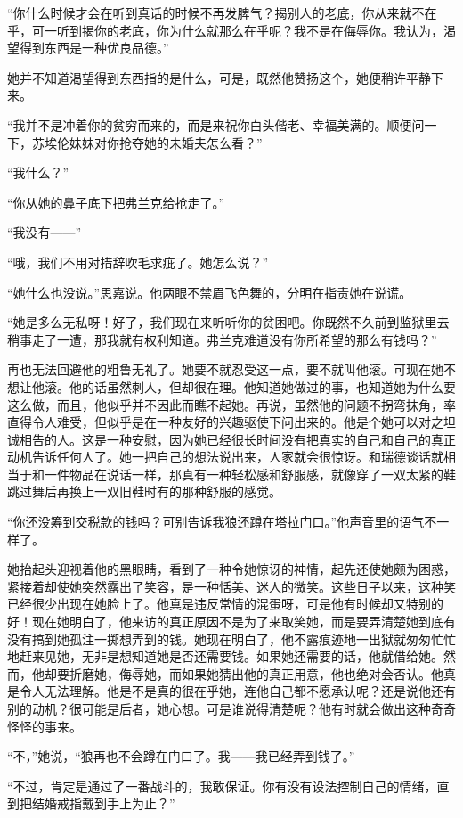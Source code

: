 \par “你什么时候才会在听到真话的时候不再发脾气？揭别人的老底，你从来就不在乎，可一听到揭你的老底，你为什么就那么在乎呢？我不是在侮辱你。我认为，渴望得到东西是一种优良品德。”
\par 她并不知道渴望得到东西指的是什么，可是，既然他赞扬这个，她便稍许平静下来。
\par “我并不是冲着你的贫穷而来的，而是来祝你白头偕老、幸福美满的。顺便问一下，苏埃伦妹妹对你抢夺她的未婚夫怎么看？”
\par “我什么？”
\par “你从她的鼻子底下把弗兰克给抢走了。”
\par “我没有——”
\par “哦，我们不用对措辞吹毛求疵了。她怎么说？”
\par “她什么也没说。”思嘉说。他两眼不禁眉飞色舞的，分明在指责她在说谎。
\par “她是多么无私呀！好了，我们现在来听听你的贫困吧。你既然不久前到监狱里去稍事走了一遭，那我就有权利知道。弗兰克难道没有你所希望的那么有钱吗？”
\par 再也无法回避他的粗鲁无礼了。她要不就忍受这一点，要不就叫他滚。可现在她不想让他滚。他的话虽然刺人，但却很在理。他知道她做过的事，也知道她为什么要这么做，而且，他似乎并不因此而瞧不起她。再说，虽然他的问题不拐弯抹角，率直得令人难受，但似乎是在一种友好的兴趣驱使下问出来的。他是个她可以对之坦诚相告的人。这是一种安慰，因为她已经很长时间没有把真实的自己和自己的真正动机告诉任何人了。她一把自己的想法说出来，人家就会很惊讶。和瑞德谈话就相当于和一件物品在说话一样，那真有一种轻松感和舒服感，就像穿了一双太紧的鞋跳过舞后再换上一双旧鞋时有的那种舒服的感觉。
\par “你还没筹到交税款的钱吗？可别告诉我狼还蹲在塔拉门口。”他声音里的语气不一样了。
\par 她抬起头迎视着他的黑眼睛，看到了一种令她惊讶的神情，起先还使她颇为困惑，紧接着却使她突然露出了笑容，是一种恬美、迷人的微笑。这些日子以来，这种笑已经很少出现在她脸上了。他真是违反常情的混蛋呀，可是他有时候却又特别的好！现在她明白了，他来访的真正原因不是为了来取笑她，而是要弄清楚她到底有没有搞到她孤注一掷想弄到的钱。她现在明白了，他不露痕迹地一出狱就匆匆忙忙地赶来见她，无非是想知道她是否还需要钱。如果她还需要的话，他就借给她。然而，他却要折磨她，侮辱她，而如果她猜出他的真正用意，他也绝对会否认。他真是令人无法理解。他是不是真的很在乎她，连他自己都不愿承认呢？还是说他还有别的动机？很可能是后者，她心想。可是谁说得清楚呢？他有时就会做出这种奇奇怪怪的事来。
\par “不，”她说，“狼再也不会蹲在门口了。我——我已经弄到钱了。”
\par “不过，肯定是通过了一番战斗的，我敢保证。你有没有设法控制自己的情绪，直到把结婚戒指戴到手上为止？”
